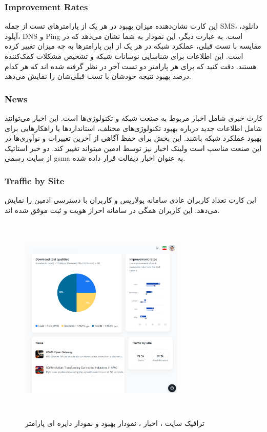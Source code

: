 \documentclass{report}
\begin{document}
\subsubsection{Improvement Rates}
این کارت نشان‌دهنده میزان بهبود در هر یک از پارامترهای تست از جمله SMS، دانلود، آپلود، DNS و Ping است. به عبارت دیگر، این نمودار به شما نشان می‌دهد که در مقایسه با تست قبلی، عملکرد شبکه در هر یک از این پارامترها به چه میزان تغییر کرده است. این اطلاعات برای شناسایی نوسانات شبکه و تشخیص مشکلات کمک‌کننده هستند. دقت کنید که برای هر پارامتر دو تست آخر در نظر گرفته شده اند که هر کدام درصد بهبود نتیجه خودشان با تست قبلی‌شان را نمایش می‌دهد.

\subsubsection{News}
کارت خبری شامل اخبار مربوط به صنعت شبکه و تکنولوژی‌ها است. این اخبار می‌توانند شامل اطلاعات جدید درباره بهبود تکنولوژی‌های مختلف، استانداردها یا راهکارهایی برای بهبود عملکرد شبکه باشند. این بخش برای حفظ آگاهی از آخرین تغییرات و نوآوری‌ها در این صنعت مناسب است ولینک اخبار نیز توسط ادمین میتواند تغییر کند. دو خبر استاتیک از سایت رسمی gsma به عنوان اخبار دیفالت قرار داده شده.

\subsubsection{Traffic by Site}
این کارت تعداد کاربران عادی سامانه پولاریس و کاربران با دسترسی ادمین را نمایش می‌دهد. این کاربران همگی در سامانه احراز هویت و ثبت موفق شده اند.
 
 \begin{figure}[h]
	\centering
		\includegraphics[width=0.7\textwidth,height=10cm,keepaspectratio]{Pic/traffic}
	\caption{ترافیک سایت ، اخبار ، نمودار بهبود و نمودار دایره ای پارامتر}
	\label{fig:traffic}
\end{figure}
\end{document}
